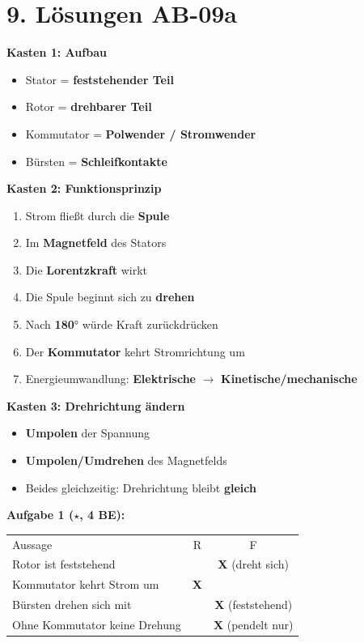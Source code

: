 \documentclass[11pt, a4paper]{article}
\newcommand{\stession}{09a}
\newcommand{\lsg}[1]{\textcolor{error}{\textbf{#1}}}
\begin{document}
\section*{9. Lösungen AB-\stession}

\begin{successbox}

\textbf{Kasten 1: Aufbau}
\begin{itemize}
    \item Stator = \lsg{feststehender Teil}
    \item Rotor = \lsg{drehbarer Teil}
    \item Kommutator = \lsg{Polwender / Stromwender}
    \item Bürsten = \lsg{Schleifkontakte}
\end{itemize}

\textbf{Kasten 2: Funktionsprinzip}
\begin{enumerate}
    \item Strom fließt durch die \lsg{Spule}
    \item Im \lsg{Magnetfeld} des Stators
    \item Die \lsg{Lorentzkraft} wirkt
    \item Die Spule beginnt sich zu \lsg{drehen}
    \item Nach \lsg{180}° würde Kraft zurückdrücken
    \item Der \lsg{Kommutator} kehrt Stromrichtung um
    \item Energieumwandlung: \lsg{Elektrische} $\rightarrow$ \lsg{Kinetische/mechanische}
\end{enumerate}

\textbf{Kasten 3: Drehrichtung ändern}
\begin{itemize}
    \item \lsg{Umpolen} der Spannung
    \item \lsg{Umpolen/Umdrehen} des Magnetfelds
    \item Beides gleichzeitig: Drehrichtung bleibt \lsg{gleich}
\end{itemize}

\textbf{Aufgabe 1 ($\star$, 4 BE):}
\begin{tabular}{lcc}
Aussage & R & F \\
Rotor ist feststehend & & \lsg{X} (dreht sich) \\
Kommutator kehrt Strom um & \lsg{X} & \\
Bürsten drehen sich mit & & \lsg{X} (feststehend) \\
Ohne Kommutator keine Drehung & & \lsg{X} (pendelt nur) \\
\end{tabular}


\end{successbox}
\end{document}
